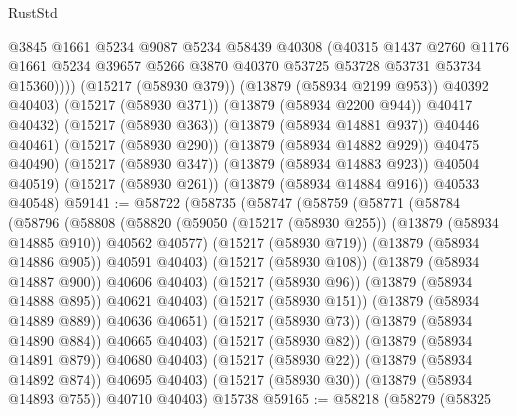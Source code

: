 \begin{lexlean}{RustStd}
\begin{coremodule}
                      @3845
                      @1661
                      @5234
                      @9087
                      @5234
                      @58439
                      @40308
                      (@40315
                        @1437
                        @2760
                        @1176
                        @1661
                        @5234
                        @39657
                        @5266
                        @3870
                        @40370
                        @53725
                        @53728
                        @53731
                        @53734
                        @15360))))
                (@15217 (@58930 @379))
                (@13879 (@58934 @2199 @953))
                @40392
                @40403)
              (@15217 (@58930 @371))
              (@13879 (@58934 @2200 @944))
              @40417
              @40432)
            (@15217 (@58930 @363))
            (@13879 (@58934 @14881 @937))
            @40446
            @40461)
          (@15217 (@58930 @290))
          (@13879 (@58934 @14882 @929))
          @40475
          @40490)
        (@15217 (@58930 @347))
        (@13879 (@58934 @14883 @923))
        @40504
        @40519)
      (@15217 (@58930 @261))
      (@13879 (@58934 @14884 @916))
      @40533
      @40548)
@59141 := @58722
    (@58735
      (@58747
        (@58759
          (@58771
            (@58784
              (@58796
                (@58808
                  (@58820
                    (@59050 (@15217 (@58930 @255)) (@13879 (@58934 @14885 @910)) @40562 @40577)
                    (@15217 (@58930 @719))
                    (@13879 (@58934 @14886 @905))
                    @40591
                    @40403)
                  (@15217 (@58930 @108))
                  (@13879 (@58934 @14887 @900))
                  @40606
                  @40403)
                (@15217 (@58930 @96))
                (@13879 (@58934 @14888 @895))
                @40621
                @40403)
              (@15217 (@58930 @151))
              (@13879 (@58934 @14889 @889))
              @40636
              @40651)
            (@15217 (@58930 @73))
            (@13879 (@58934 @14890 @884))
            @40665
            @40403)
          (@15217 (@58930 @82))
          (@13879 (@58934 @14891 @879))
          @40680
          @40403)
        (@15217 (@58930 @22))
        (@13879 (@58934 @14892 @874))
        @40695
        @40403)
      (@15217 (@58930 @30))
      (@13879 (@58934 @14893 @755))
      @40710
      @40403)
    @15738
@59165 := @58218
    (@58279
      (@58325

\end{coremodule}
\end{lexlean}
